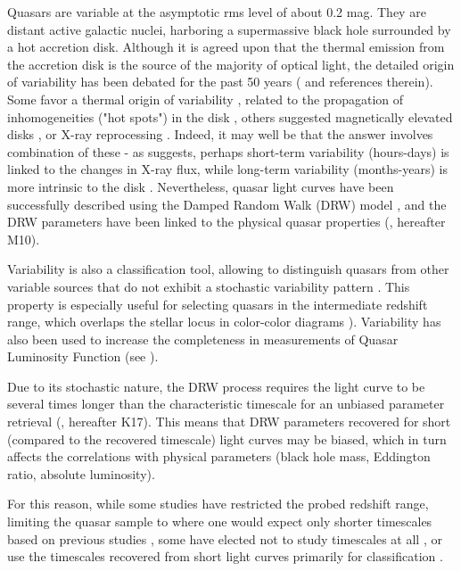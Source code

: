 \documentclass[twocolumn]{aastex62}
\begin{document}
Quasars are variable at the asymptotic rms level of about 0.2 mag. They are distant active galactic nuclei, harboring a supermassive black hole surrounded by a hot accretion disk. Although it is agreed upon that the thermal emission from the accretion disk is the source of the majority of optical light, the detailed origin of variability has been debated for the past 50 years (\citealt{sun2018} and references therein). Some favor a thermal origin of variability \citep{kelly2013}, related to the propagation of inhomogeneities ("hot spots") in the disk \citep{dexter2011, cai2016}, others suggested magnetically elevated disks \citep{dexter2019}, or X-ray reprocessing  \citep{kubota2018}.  Indeed, it may well be that the answer involves combination of these -  as \cite{sanchez2018} suggests, perhaps short-term variability (hours-days) is linked to the changes in X-ray flux, while long-term variability (months-years) is more intrinsic to the disk \citep{edelson2015,lira2015}. Nevertheless, quasar light curves have been successfully described using the Damped Random Walk (DRW) model \citep{kelly2009, macleod2010, kozlowski2010, zu2011, kasliwal2015a}, and the DRW parameters have been linked to the physical quasar properties (\citealt{macleod2010}, hereafter M10). 

Variability is also a classification tool, allowing to distinguish quasars from other variable sources that do not exhibit a stochastic variability pattern \citep{macleod2011}. This property is especially useful for selecting quasars in the intermediate redshift range, which overlaps the stellar locus in color-color diagrams \citep{sesar2007, yang2017}). Variability has also been used to increase the completeness in measurements of Quasar Luminosity Function (see \citealt{ ross2013, palanque2013, alsayyad2016, mcgreer2013, mcgreer2018}). 

Due to its stochastic nature, the DRW process requires the light curve to be several times longer than the characteristic timescale for an unbiased parameter retrieval (\citealt{kozlowski2010, kozlowski2017a}, hereafter K17). This means that DRW parameters recovered for short (compared to the recovered timescale) light curves may be biased, which in turn affects the correlations with physical parameters (black hole mass, Eddington ratio, absolute luminosity). 

For this reason, while some studies have restricted the probed redshift range, limiting the quasar sample to where one would expect only shorter timescales based on previous studies \citep{sun2018, guo2017, kelly2013,simm2016}, some have elected not to study timescales at all \citep{sun2018,sanchez2018}, or use the timescales recovered from short light curves primarily for classification \citep{hernitschek2016}.
\end{document}
